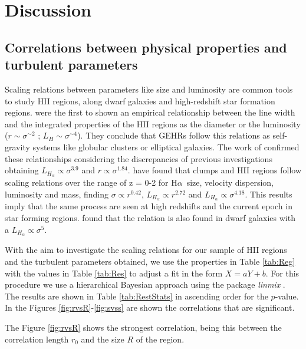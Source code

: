 \documentclass[fleqn,usenatbib, useAMS, a4paper]{mnras}
\newcommand\halpha{H${\alpha}$}
\begin{document}

\section{Discussion}\label{sec:discussion}

\subsection{Correlations between physical properties and turbulent parameters}

Scaling relations between parameters like size and luminosity are common tools to study HII regions, along dwarf galaxies and high-redshift star formation regions.
\citet{melnick1977,terlevich1981} were the first to shown an empirical relationship between the line width and the integrated properties of the HII regions as the diameter or the luminosity ($r \sim \sigma ^{\sim 2}$ ; $L_{H} \sim \sigma ^{\sim 4}$).
They conclude that GEHRs follow this relations as self-gravity systems like globular clusters or elliptical galaxies.
The work of \citet{1988A&A...201..199A} confirmed these relationships considering the discrepancies of previous investigations obtaining \(L_{H_{\alpha}} \propto \sigma^{3.9}\) and \(r \propto \sigma^{1.84}\).
\citet{2012MNRAS.422.3339W} have found that clumps and HII regions follow scaling relations over the range of z = 0-2 for \halpha\ size, velocity dispersion, luminosity and mass, finding \(\sigma \propto r^{0.42}\), \(L_{H_{\alpha}} \propto r^{2.72}\) and \(L_{H_{\alpha}} \propto \sigma^{4.18}\). 
This results imply that the same process are seen at high redshifts and the current epoch in star forming regions.
\citet{2015MNRAS.449.3568M} found that the relation is also found in dwarf galaxies with a \(L_{H_{\alpha}} \propto \sigma^{5}\).   

With the aim to investigate the scaling relations for our sample of HII regions and the turbulent parameters obtained, we use the properties in Table \ref{tab:Reg} with the values in Table \ref{tab:Res} to adjust a fit in the form $X = aY +b$. 
For this procedure we use a hierarchical Bayesian approach using the package \textit{linmix} \citep{2007ApJ...665.1489K}.
The results are shown in Table \ref{tab:RestStats} in ascending order for the $p$-value.
In the Figures \ref{fig:rvsR}-\ref{fig:svss} are shown the correlations that are significant.

The Figure \ref{fig:rvsR} shows the strongest correlation, being this between the correlation length $r_0$ and the size $R$ of the region.
\end{document}
